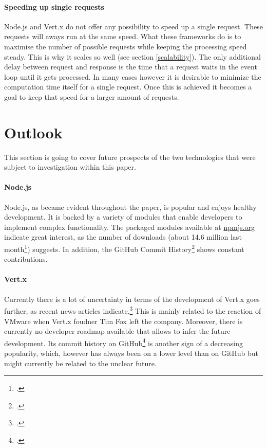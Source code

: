 \paragraph{Speeding up single requests}
Node.js and Vert.x do not offer any possibility to speed up a single request.
These requests will aways run at the same speed. What these frameworks do is to
maximise the number of possible requests while keeping the processing speed
steady. This is why it scales so well (see section \ref{scalability}). The only
additional delay between request and response is the time that a request waits
in the event loop until it gets processed.  In many cases however it is
desirable to minimize the computation time itself for a single request. Once
this is achieved it becomes a goal to keep that speed for a larger amount of
requests.\\


\section{Outlook}

This section is going to cover future prospects of the two technologies that were subject to investigation within this paper.\\

\paragraph{Node.js} Node.js, as became evident throughout the paper, is popular and enjoys healthy development. It is backed by a variety of modules that enable developers to implement complex functionality. The packaged modules available at \url{npmjs.org} indicate great interest, as the number of downloads (about 14.6 million last month\footcite[Cf.][]{node_packages}) suggests. In addition, the GitHub Commit History\footcite[Cf.][]{vertxcommithistory_2013} shows constant contributions. 

\paragraph{Vert.x} Currently there is a lot of uncertainty in terms of the
development of Vert.x goes further, as recent news articles
indicate.\footcite[Cf.][]{Asay_2013} This is mainly related to the reaction of
VMware when Vert.x foudner Tim Fox left the company. Moreover, there is
currently no developer roadmap available that allows to infer the future
development. Its commit history on
GitHub\footcite[Cf.][]{vertxcommithistory_2013} is another sign of a decreasing
popularity, which, however has always been on a lower level than on GitHub but
might currently be related to the unclear future.

